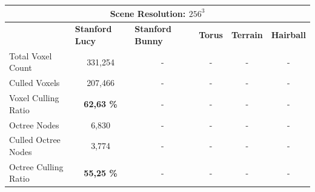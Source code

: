 

















\begin{table}[h]
    \begin{tabular}{|lccccc|}
    \hline
    \multicolumn{6}{|c|}{\textbf{Scene Resolution: $256^3$}}                                                                                                                                                                                                         \\ \hline
    \multicolumn{1}{|l|}{}                          & \multicolumn{1}{|l|}{\textbf{Stanford Lucy}}  & \multicolumn{1}{l|}{\textbf{Stanford Bunny}}  & \multicolumn{1}{l|}{\textbf{Torus}}   & \multicolumn{1}{l|}{\textbf{Terrain}}     & \multicolumn{1}{l|}{\textbf{Hairball}}    \\ \hline
    \multicolumn{1}{|l|}{Total Voxel Count}         & \multicolumn{1}{c|}{331,254}                  & \multicolumn{1}{c|}{-}                        & \multicolumn{1}{c|}{-}                & \multicolumn{1}{c|}{-}                    & \multicolumn{1}{c|}{-}                    \\
    \multicolumn{1}{|l|}{Culled Voxels}             & \multicolumn{1}{c|}{207,466}                  & \multicolumn{1}{c|}{-}                        & \multicolumn{1}{c|}{-}                & \multicolumn{1}{c|}{-}                    & -                                         \\
    \multicolumn{1}{|l|}{Voxel Culling Ratio}       & \multicolumn{1}{c|}{\textbf{62,63 \%}}        & \multicolumn{1}{c|}{-}                        & \multicolumn{1}{c|}{-}                & \multicolumn{1}{c|}{-}                    & -                                         \\ \hline
    \multicolumn{1}{|l|}{Octree Nodes}              & \multicolumn{1}{c|}{6,830}                    & \multicolumn{1}{c|}{-}                        & \multicolumn{1}{c|}{-}                & \multicolumn{1}{c|}{-}                    & -                                         \\
    \multicolumn{1}{|l|}{Culled Octree Nodes}       & \multicolumn{1}{c|}{3,774}                    & \multicolumn{1}{c|}{-}                        & \multicolumn{1}{c|}{-}                & \multicolumn{1}{c|}{-}                    & -                                         \\
    \multicolumn{1}{|l|}{Octree Culling Ratio}      & \multicolumn{1}{c|}{\textbf{55,25 \%}}        & \multicolumn{1}{c|}{-}                        & \multicolumn{1}{c|}{-}                & \multicolumn{1}{c|}{-}                    & -                                         \\ \hline
    \end{tabular}
\end{table}


